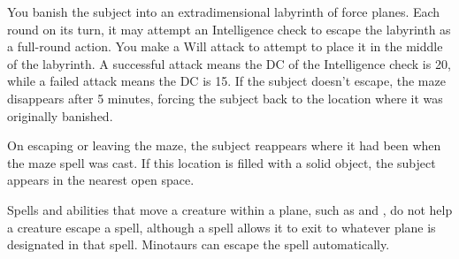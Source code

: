 \begin{spelleffect}
    You banish the subject into an extradimensional labyrinth of force planes. Each round on its turn, it may attempt an Intelligence check to escape the labyrinth as a full-round action. You make a Will attack to attempt to place it in the middle of the labyrinth. A successful attack means the DC of the Intelligence check is 20, while a failed attack means the DC is 15. If the subject doesn't escape, the maze disappears after 5 minutes, forcing the subject back to the location where it was originally banished.
    \par On escaping or leaving the maze, the subject reappears where it had been when the maze spell was cast. If this location is filled with a solid object, the subject appears in the nearest open space.
\end{spelleffect}
\begin{spellnotes}
    Spells and abilities that move a creature within a plane, such as  and , do not help a creature escape a  spell, although a  spell allows it to exit to whatever plane is designated in that spell. Minotaurs can escape the spell automatically.
\end{spellnotes}

